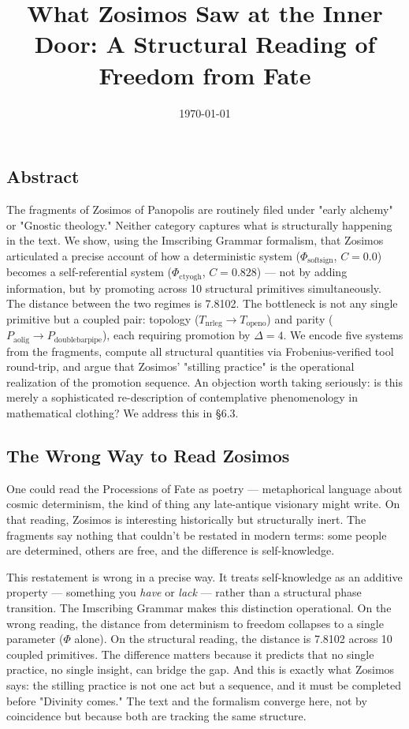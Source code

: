 \documentclass[12pt,a4paper]{article}
\newcommand{\pilcrow}{\S}
\begin{document}
\title{What Zosimos Saw at the Inner Door: A Structural Reading of Freedom from Fate}
\date{\today}

\maketitle

\subsection{Abstract}

The fragments of Zosimos of Panopolis are routinely filed under "early alchemy" or "Gnostic theology." Neither category captures what is structurally happening in the text. We show, using the Imscribing Grammar formalism, that Zosimos articulated a precise account of how a deterministic system ($\Phi_{\text{softsign}}$, $C = 0.0$) becomes a self-referential system ($\Phi_{\text{ctyogh}}$, $C = 0.828$) --- not by adding information, but by promoting across 10 structural primitives simultaneously. The distance between the two regimes is 7.8102. The bottleneck is not any single primitive but a coupled pair: topology ($T_{\text{nrleg}} \to T_{\text{openo}}$) and parity ($P_{\text{aolig}} \to P_{\text{doublebarpipe}}$), each requiring promotion by $\Delta = 4$. We encode five systems from the fragments, compute all structural quantities via Frobenius-verified tool round-trip, and argue that Zosimos' "stilling practice" is the operational realization of the promotion sequence. An objection worth taking seriously: is this merely a sophisticated re-description of contemplative phenomenology in mathematical clothing? We address this in \pilcrow{}6.3.

\subsection{The Wrong Way to Read Zosimos}

One could read the Processions of Fate as poetry --- metaphorical language about cosmic determinism, the kind of thing any late-antique visionary might write. On that reading, Zosimos is interesting historically but structurally inert. The fragments say nothing that couldn't be restated in modern terms: some people are determined, others are free, and the difference is self-knowledge.

This restatement is wrong in a precise way. It treats self-knowledge as an additive property --- something you \emph{have} or \emph{lack} --- rather than a structural phase transition. The Imscribing Grammar makes this distinction operational. On the wrong reading, the distance from determinism to freedom collapses to a single parameter ($\Phi$ alone). On the structural reading, the distance is 7.8102 across 10 coupled primitives. The difference matters because it predicts that no single practice, no single insight, can bridge the gap. And this is exactly what Zosimos says: the stilling practice is not one act but a sequence, and it must be completed before "Divinity comes." The text and the formalism converge here, not by coincidence but because both are tracking the same structure.
\end{document}
